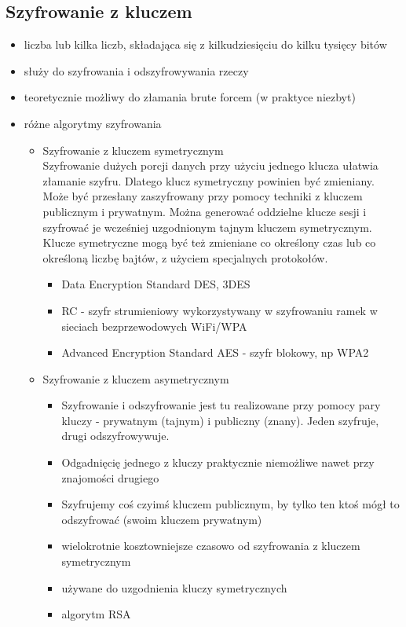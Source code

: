 \documentclass[../main.tex]{subfiles}
\begin{document}
    \subsection{Szyfrowanie z kluczem}
    \begin{itemize}
        \item liczba lub kilka liczb, składająca się z kilkudziesięciu do kilku tysięcy bitów
        \item służy do szyfrowania i odszyfrowywania rzeczy
        \item teoretycznie możliwy do złamania brute forcem (w praktyce niezbyt)
        \item różne algorytmy szyfrowania
        \begin{itemize}
            \item Szyfrowanie z kluczem symetrycznym\\
            Szyfrowanie dużych porcji danych przy użyciu jednego klucza ułatwia złamanie
            szyfru. Dlatego klucz symetryczny powinien być zmieniany. Może być przesłany zaszyfrowany przy pomocy techniki z kluczem
            publicznym i prywatnym. Można generować oddzielne klucze sesji i szyfrować je
            wcześniej uzgodnionym tajnym kluczem symetrycznym. Klucze symetryczne mogą być też
            zmieniane co określony czas lub co określoną liczbę bajtów, z użyciem specjalnych
            protokołów.
            \begin{itemize}
                \item Data Encryption Standard DES, 3DES
                \item RC - szyfr strumieniowy wykorzystywany w szyfrowaniu ramek w sieciach bezprzewodowych WiFi/WPA
                \item Advanced Encryption Standard AES - szyfr blokowy, np WPA2
            \end{itemize}
            \item Szyfrowanie z kluczem asymetrycznym
            \begin{itemize}
                \item Szyfrowanie i odszyfrowanie jest tu realizowane przy pomocy pary kluczy - prywatnym
                (tajnym) i publiczny (znany). Jeden szyfruje, drugi odszyfrowywuje.
                \item Odgadnięcię jednego z kluczy praktycznie niemożliwe nawet przy znajomości drugiego
                \item Szyfrujemy coś czyimś kluczem publicznym, by tylko ten ktoś mógł to odszyfrować (swoim kluczem prywatnym)
                \item wielokrotnie kosztowniejsze
                czasowo od szyfrowania z kluczem symetrycznym
                \item używane do uzgodnienia kluczy symetrycznych
                \item algorytm RSA
            \end{itemize}
        \end{itemize}

    \end{itemize}
\end{document}
